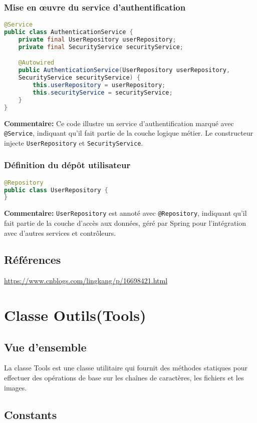 \documentclass{article}
\begin{document}
\subsubsection{Mise en œuvre du service d'authentification}
\begin{lstlisting}[language=Java]
@Service
public class AuthenticationService {
    private final UserRepository userRepository;
    private final SecurityService securityService;

    @Autowired
    public AuthenticationService(UserRepository userRepository, 
    SecurityService securityService) {
        this.userRepository = userRepository;
        this.securityService = securityService;
    }
}
\end{lstlisting}
\textbf{Commentaire:} Ce code illustre un service d'authentification marqué avec \texttt{@Service}, indiquant qu'il fait partie de la couche logique métier. Le constructeur injecte \texttt{UserRepository} et \texttt{SecurityService}.

\subsubsection{Définition du dépôt utilisateur}
\begin{lstlisting}[language=Java]
@Repository
public class UserRepository {
}
\end{lstlisting}
\textbf{Commentaire:} \texttt{UserRepository} est annoté avec \texttt{@Repository}, indiquant qu'il fait partie de la couche d'accès aux données, géré par Spring pour l'intégration avec d'autres services et contrôleurs.

\subsection{Références}
\href{https://www.cnblogs.com/lingkang/p/16698421.html}{https://www.cnblogs.com/lingkang/p/16698421.html}
\section{Classe Outils(Tools)}
\subsection{Vue d'ensemble}
La classe Tools est une classe utilitaire qui fournit des méthodes statiques pour effectuer des opérations de base sur les chaînes de caractères, les fichiers et les images.
\subsection{Constants}
\end{document}
